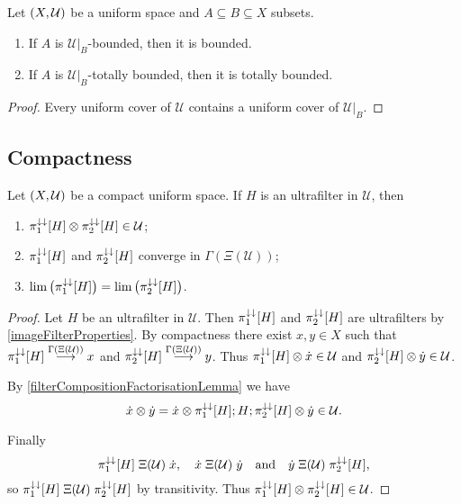 \begin{lemma} \label{subspaceBoundedness}
Let $\sSet{X, \mathcal{U}}$ be a uniform space and $A\subseteq B\subseteq X$ subsets.
\begin{enumerate}
\item If $A$ is $\mathcal{U}|_B$-bounded, then it is bounded.
\item If $A$ is $\mathcal{U}|_B$-totally bounded, then it is totally bounded.
\end{enumerate}
\end{lemma}
\begin{proof}
Every uniform cover of $\mathcal{U}$ contains a uniform cover of $\mathcal{U}|_B$.
\end{proof}

\subsection{Compactness}
\begin{proposition} \label{compactUltrafilterFactorisation}
Let $\sSet{X,\mathcal{U}}$ be a compact uniform space. If $H$ is an ultrafilter in $\mathcal{U}$, then 
\begin{enumerate}
\item $\pi_1^{\downarrow\downarrow}[H]\otimes \pi_2^{\downarrow\downarrow}[H] \in\mathcal{U}$;
\item $\pi_1^{\downarrow\downarrow}[H]$ and $\pi_2^{\downarrow\downarrow}[H]$ converge in $\Gamma(\Xi(\mathcal{U}))$;
\item $\lim\big(\pi_1^{\downarrow\downarrow}[H]\big) = \lim\big(\pi_2^{\downarrow\downarrow}[H]\big)$.
\end{enumerate}
\end{proposition}
\begin{proof}
Let $H$ be an ultrafilter in $\mathcal{U}$. Then $\pi_1^{\downarrow\downarrow}[H]$ and $\pi_2^{\downarrow\downarrow}[H]$ are ultrafilters by \ref{imageFilterProperties}. By compactness there exist $x,y\in X$ such that $\pi_1^{\downarrow\downarrow}[H] \overset{\Gamma(\Xi(\mathcal{U}))}{\longrightarrow} x$ and $\pi_2^{\downarrow\downarrow}[H] \overset{\Gamma(\Xi(\mathcal{U}))}{\longrightarrow} y$. Thus $\pi_1^{\downarrow\downarrow}[H]\otimes \dot{x}\in\mathcal{U}$ and $\pi_2^{\downarrow\downarrow}[H]\otimes \dot{y}\in\mathcal{U}$. 

By \ref{filterCompositionFactorisationLemma} we have
\[ \dot{x}\otimes \dot{y} = \dot{x}\otimes \pi_1^{\downarrow\downarrow}[H]; H; \pi_2^{\downarrow\downarrow}[H] \otimes \dot{y} \in \mathcal{U}. \]

Finally
\[ \pi_1^{\downarrow\downarrow}[H] \mathrel{\Xi(\mathcal{U})} \dot{x}, \quad \dot{x} \mathrel{\Xi(\mathcal{U})} \dot{y} \quad\text{and}\quad \dot{y}\mathrel{\Xi(\mathcal{U})} \pi_2^{\downarrow\downarrow}[H], \]
so $\pi_1^{\downarrow\downarrow}[H] \mathrel{\Xi(\mathcal{U})} \pi_2^{\downarrow\downarrow}[H]$ by transitivity. Thus $\pi_1^{\downarrow\downarrow}[H]\otimes \pi_2^{\downarrow\downarrow}[H] \in \mathcal{U}$.
\end{proof}

